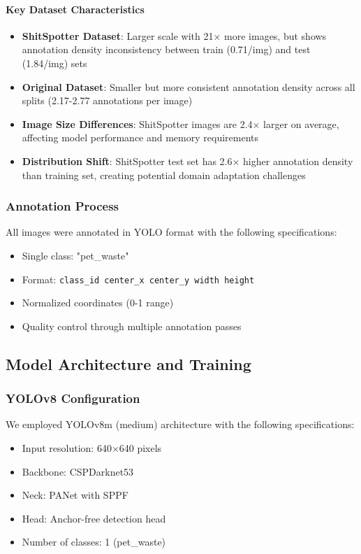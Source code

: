 \documentclass[12pt,a4paper]{article}
\begin{document}
\paragraph{Key Dataset Characteristics}
\begin{itemize}
    \item \textbf{ShitSpotter Dataset}: Larger scale with 21× more images, but shows annotation density inconsistency between train (0.71/img) and test (1.84/img) sets
    \item \textbf{Original Dataset}: Smaller but more consistent annotation density across all splits (2.17-2.77 annotations per image)
    \item \textbf{Image Size Differences}: ShitSpotter images are 2.4× larger on average, affecting model performance and memory requirements
    \item \textbf{Distribution Shift}: ShitSpotter test set has 2.6× higher annotation density than training set, creating potential domain adaptation challenges
\end{itemize}

\subsubsection{Annotation Process}
All images were annotated in YOLO format with the following specifications:
\begin{itemize}
    \item Single class: "pet\_waste"
    \item Format: \texttt{class\_id center\_x center\_y width height}
    \item Normalized coordinates (0-1 range)
    \item Quality control through multiple annotation passes
\end{itemize}

\subsection{Model Architecture and Training}

\subsubsection{YOLOv8 Configuration}
We employed YOLOv8m (medium) architecture with the following specifications:
\begin{itemize}
    \item Input resolution: 640×640 pixels
    \item Backbone: CSPDarknet53
    \item Neck: PANet with SPPF
    \item Head: Anchor-free detection head
    \item Number of classes: 1 (pet\_waste)
\end{itemize}
\end{document}
